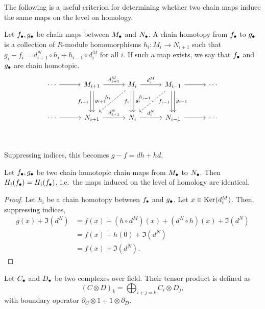 The following is a useful criterion for determining whether two chain maps induce the same maps on the level on homology.
\begin{definition}
    Let $f_\bullet, g_\bullet$ be chain maps between  $M_\bullet$ and $N_\bullet$.
    A chain homotopy from  $f_\bullet$ to  $g_\bullet$ is a collection of  $R$-module homomorphisms $h_i: M_i \to  N_{i+1}$ such that $g_i - f_i = d^{N}_{i+1}  \circ  h_i + h_{i-1}  \circ  d_i^{M}$ for all $i$.
    If such a map exists, we say that $f_\bullet$ and  $g_\bullet$ are chain homotopic.
    \[
        \begin{tikzcd}[column sep=3em, row sep=3em]
            \cdots  \arrow[r, ""]&
            M_{i+1} \arrow[r, "d_{i+1}^{M}"] \arrow[d, "f_{i+1}"', shift right=2pt] \arrow[d, "g_{i+1}", shift left=2pt]&
            M_{i} \arrow[r, "d_{i}^{M}"] \arrow[d, "f_i"', shift right=2pt] \arrow[d, "g_{i}", shift left=2pt] \arrow[dl, "h_i"', dashed]&
            M_{i-1} \arrow[r, ""] \arrow[d, "f_{i-1}"', shift right=2pt]\arrow[d, "g_{i-1}", shift left=2pt] \arrow[dl, "h_{i-1}"', dashed]&
            \cdots \\
            \cdots  \arrow[r, ""]&
            N_{i+1} \arrow[r, "d_{i+1}^{N}"] &
            N_{i} \arrow[r, "d_{i}^{N}"] &
            N_{i-1} \arrow[r, ""] &
            \cdots \\
        \end{tikzcd}
    \]
    Suppressing indices, this becomes $g - f = dh + hd$.
\end{definition}
\begin{prop}
    Let $f_\bullet, g_\bullet$ be two chain homotopic chain maps from $M_\bullet$ to $N_\bullet$. 
    Then $H_i(f_\bullet) = H_i(f_\bullet)$, i.e.\ the maps induced on the level of homology are identical.
\end{prop}
\begin{proof}
    Let $h_i$ be a chain homotopy between  $f_\bullet$ and  $g_\bullet$.
    Let $x \in \operatorname{Ker}(d_i^{M})$.
    Then, suppressing indices,
    \begin{align*}
        g(x) + \Im(d^{N}) &= f(x) + (h  \circ  d^{M})(x) + (d^{N}  \circ h)(x)  + \Im(d^{N})\\
                          &= f(x) + h(0) + \Im(d^{N})\\
                        &= f(x) + \Im(d^{N}).
    \end{align*} 
\end{proof}
\begin{definition}
    Let $C_\bullet$ and  $D_\bullet$ be two complexes over field. Their tensor product is defined as
     \[
         (C \otimes D)_k = \bigoplus_{i+j = k} C_i \otimes D_j
    ,\] 
    with boundary operator $\partial_C \otimes 1 + 1 \otimes\partial_D$.
\end{definition}
